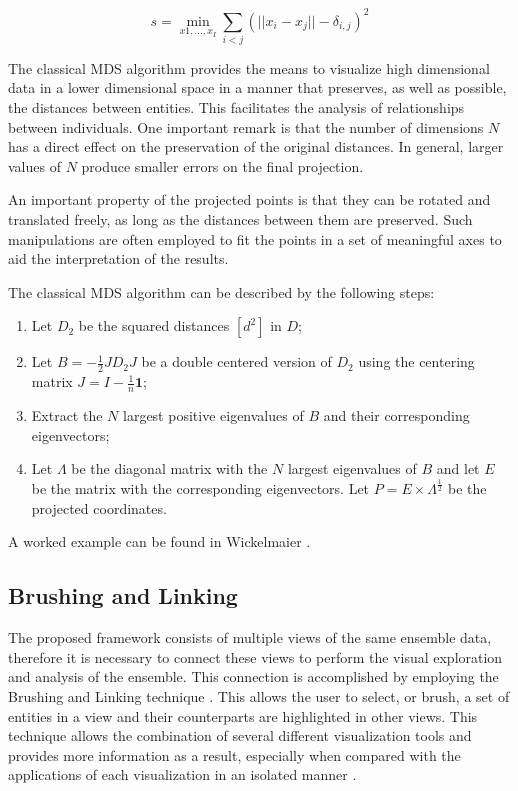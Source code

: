 \documentclass[final,5p,times,twocolumn]{elsarticle}
\begin{document}
\begin{equation}
s = \min_{x1, ..., x_I} \sum_{i < j} (||x_i - x_j|| - \delta_{i,j})^2  
\label{eq:stress-mds}
\end{equation}

The classical MDS algorithm provides the means to visualize high dimensional data in a lower dimensional space in a manner that preserves, as well as possible, the distances between entities. This facilitates the analysis of relationships between individuals. One important remark is that the number of dimensions $N$ has a direct effect on the preservation of the original distances. In general, larger values of $N$ produce smaller errors on the final projection.

An important property of the projected points is that they can be rotated and translated freely, as long as the distances between them are preserved. Such manipulations are often employed to fit the points in a set of meaningful axes to aid the interpretation of the results.

The classical MDS algorithm can be described by the following steps:

\begin{enumerate}
  \item Let $D_2$ be the squared distances $[d^2]$ in $D$;
  \item Let $B = -\frac{1}{2}J D_2 J$ be a double centered version of $D_2$ using the centering matrix $J = I - \frac{1}{n} \textbf{1}$;
  \item Extract the $N$ largest positive eigenvalues of $B$ and their corresponding eigenvectors;
  \item Let $\Lambda$ be the diagonal matrix with the $N$ largest eigenvalues of $B$ and let $E$ be the matrix with the corresponding eigenvectors. Let $P = E \times \Lambda^\frac{1}{2}$  be the projected coordinates.
\end{enumerate}

\noindent
A worked example can be found in Wickelmaier \cite{mds-wickelmaier:2003}.

\subsection{Brushing and Linking}
\label{sec:brush}
The proposed framework consists of multiple views of the same ensemble data, therefore it is necessary to connect these views to perform the visual exploration and analysis of the ensemble. This connection is accomplished by employing the Brushing and Linking technique \cite{brush-becker:1987, link-buja:1991}. This allows the user to select, or brush, a set of entities in a view and their counterparts are highlighted in other views. This technique allows the combination of several different visualization tools and provides more information as a result, especially when compared with the applications of each visualization in an isolated manner \cite{keim:2002}.
\end{document}
